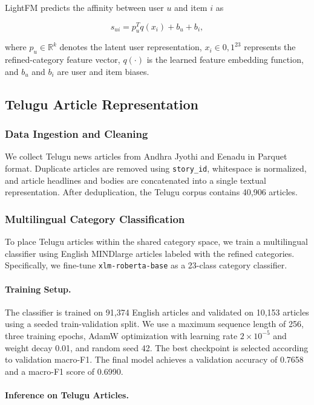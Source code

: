 \documentclass[conference]{IEEEtran}
\begin{document}
LightFM predicts the affinity between user $u$ and item $i$ as

\[
s_{ui}=p_u^Tq(x_i)+b_u+b_i,
\]

where $p_u \in \mathbb{R}^{k}$ denotes the latent user representation, $x_i \in {0,1}^{23}$ represents the refined-category feature vector, $q(\cdot)$ is the learned feature embedding function, and $b_u$ and $b_i$ are user and item biases.

\subsection{Telugu Article Representation}

\subsubsection{Data Ingestion and Cleaning}

We collect Telugu news articles from Andhra Jyothi and Eenadu in Parquet format. Duplicate articles are removed using \texttt{story\_id}, whitespace is normalized, and article headlines and bodies are concatenated into a single textual representation. After deduplication, the Telugu corpus contains 40,906 articles.

\subsubsection{Multilingual Category Classification}

To place Telugu articles within the shared category space, we train a multilingual classifier using English MINDlarge articles labeled with the refined categories. Specifically, we fine-tune \texttt{xlm-roberta-base} as a 23-class category classifier.

\paragraph{Training Setup.}

The classifier is trained on 91,374 English articles and validated on 10,153 articles using a seeded train-validation split. We use a maximum sequence length of 256, three training epochs, AdamW optimization with learning rate $2\times10^{-5}$ and weight decay 0.01, and random seed 42. The best checkpoint is selected according to validation macro-F1. The final model achieves a validation accuracy of 0.7658 and a macro-F1 score of 0.6990.

\paragraph{Inference on Telugu Articles.}
\end{document}
